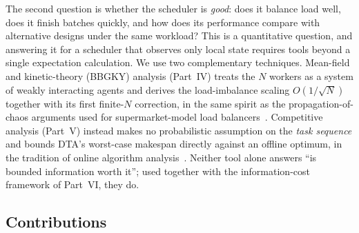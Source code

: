 \documentclass[11pt,a4paper]{report}
\begin{document}
The second question is whether the scheduler is \emph{good}: does it
balance load well, does it finish batches quickly, and how does its
performance compare with alternative designs under the same workload?
This is a quantitative question, and answering it for a scheduler that
observes only local state requires tools beyond a single expectation
calculation. We use two complementary techniques. Mean-field and
kinetic-theory (BBGKY) analysis (Part~IV) treats the $N$ workers as a
system of weakly interacting agents and derives the load-imbalance scaling
$O(1/\sqrt{N})$ together with its first finite-$N$ correction, in the same
spirit as the propagation-of-chaos arguments used for supermarket-model
load balancers~\cite{mitzenmacher2001,vvedenskaya1996}. Competitive
analysis (Part~V) instead makes no probabilistic assumption on the
\emph{task sequence} and
bounds DTA's worst-case makespan directly against an offline optimum,
in the tradition of online algorithm analysis~\cite{borodin_elyaniv1998}.
Neither tool alone answers ``is bounded information worth it''; used
together with the information-cost framework of Part~VI, they do.

\subsection*{Contributions}
\end{document}
